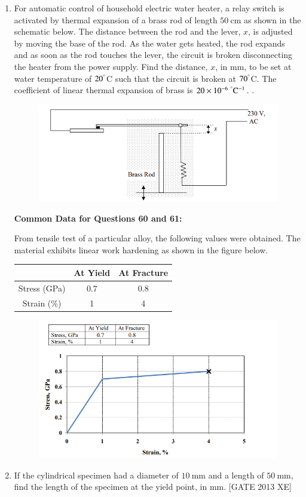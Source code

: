 \documentclass[journal,12pt,onecolumn]{IEEEtran}
\theoremstyle{remark}
\begin{document}
\begin{enumerate}
\item For automatic control of household electric water heater, a relay switch is activated by thermal expansion of a brass rod of length $50\ \mathrm{cm}$ as shown in the schematic below. 
The distance between the rod and the lever, $x$, is adjusted by moving the base of the rod. As the water gets heated, the rod expands and as soon as the rod touches the lever, the circuit is broken disconnecting the heater from the power supply. Find the distance, $x$, in mm, to be set at water temperature of $20^\degree$C such that the circuit is broken at $70^\degree$C. The coefficient of linear thermal expansion of brass is $20 \times 10^{-6}\ ^\degree\mathrm{C}^{-1}$. \underline{\hspace{2.5cm}}.
\begin{figure}[H]
    \centering
    \includegraphics[width=0.5\columnwidth]{figs/fig6.png}
    \caption{}
    \label{fig:fig6}
\end{figure}
\textbf{Common Data for Questions 60 and 61:}  

From tensile test of a particular alloy, the following values were obtained.  
The material exhibits linear work hardening as shown in the figure below.


\begin{tabular}{|c|c|c|}
\hline
 & \textbf{At Yield} & \textbf{At Fracture} \\
\hline
Stress (GPa) & 0.7 & 0.8 \\
Strain (\%) & 1 & 4 \\
\hline
\end{tabular}
\begin{figure}[H]
    \centering
    \includegraphics[width=0.5\columnwidth]{figs/fig7.png}
    \caption{}
    \label{fig:fig7}
\end{figure}
\item If the cylindrical specimen had a diameter of $10\ \mathrm{mm}$ and a length of $50\ \mathrm{mm}$, find the length of the specimen at the yield point, in mm. \underline{\hspace{2cm}} \hfill[GATE 2013 XE]


\end{enumerate}
\end{document}
